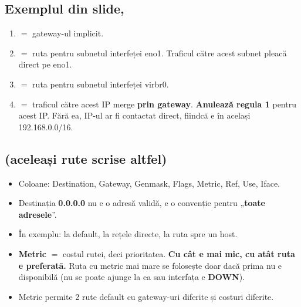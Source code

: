 \documentclass[11pt,a4paper]{article}
\begin{document}
\subsection*{Exemplul din slide, }
\begin{enumerate}
  \item {} $=$ gateway-ul implicit.
  \item {} $=$ ruta pentru subnetul interfeței eno1. Traficul către acest subnet pleacă direct pe eno1.
  \item {} $=$ ruta pentru subnetul interfeței virbr0.
  \item {} $=$ traficul către acest IP merge \textbf{prin gateway}. \textbf{Anulează regula 1} pentru acest IP. Fără ea, IP-ul ar fi contactat direct, fiindcă e în același 192.168.0.0/16.
\end{enumerate}

\subsection*{ (aceleași rute scrise altfel)}
\begin{itemize}
  \item Coloane: Destination, Gateway, Genmask, Flags, Metric, Ref, Use, Iface.
  \item Destinația \textbf{0.0.0.0} nu e o adresă validă, e o convenție pentru „\textbf{toate adresele}”.
  \item În exemplu:  la default,  la rețele directe,  la ruta spre un host.
  \item \textbf{Metric} $=$ costul rutei, deci prioritatea. \textbf{Cu cât e mai mic, cu atât ruta e preferată.} Ruta cu metric mai mare se folosește doar dacă prima nu e disponibilă (nu se poate ajunge la ea sau interfața e \textbf{DOWN}).
  \item Metric permite 2 rute default cu gateway-uri diferite și costuri diferite.
\end{itemize}
\end{document}
